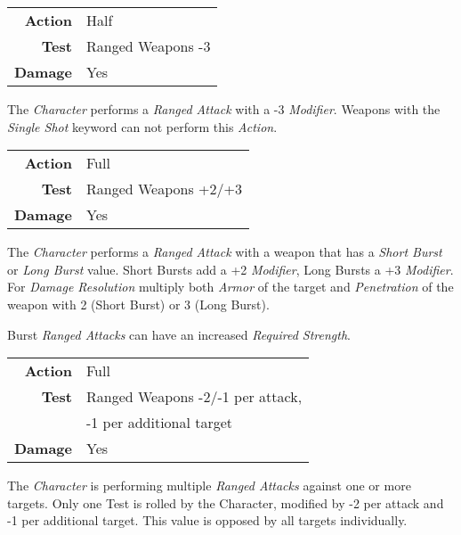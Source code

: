 
\begin{tabular}{rl}
    \textbf{Action} & Half              \\
    \textbf{Test}   & Ranged Weapons -3 \\
    \textbf{Damage} & Yes               \\
\end{tabular}

\hfill

The \emph{Character} performs a \emph{Ranged Attack} with a -3 \emph{Modifier}.
Weapons with the \emph{Single Shot} keyword can not perform this \emph{Action}.



\begin{tabular}{rl}
    \textbf{Action} & Full                 \\
    \textbf{Test}   & Ranged Weapons +2/+3 \\
    \textbf{Damage} & Yes                  \\
\end{tabular}

\hfill

The \emph{Character} performs a \emph{Ranged Attack} with a weapon that has a
\emph{Short Burst} or \emph{Long Burst} value. Short Bursts add a +2
\emph{Modifier}, Long Bursts a +3 \emph{Modifier}. For \emph{Damage Resolution}
multiply both \emph{Armor} of the target and \emph{Penetration} of the weapon
with 2 (Short Burst) or 3 (Long Burst).

Burst \emph{Ranged Attacks} can have an increased \emph{Required Strength}.


\begin{tabular}{rl}
    \textbf{Action} & Full                             \\
    \textbf{Test}   & Ranged Weapons -2/-1 per attack, \\
                    & -1 per additional target         \\
    \textbf{Damage} & Yes                              \\
\end{tabular}

\hfill

The \emph{Character} is performing multiple \emph{Ranged Attacks} against one or
more targets. Only one Test is rolled by the Character, modified by -2 per
attack and -1 per additional target. This value is opposed by
all targets individually.

